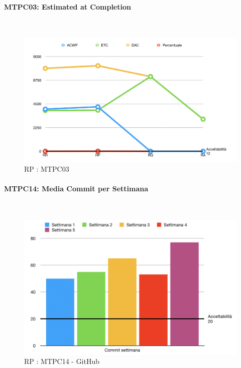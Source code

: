 \pagebreak

\paragraph{MTPC03: Estimated at Completion}\-\\
\begin{figure}[H]
	\begin{center}
		\includegraphics[scale=0.5]{./images/grafici_RP/MTPC03.png} 
	\end{center}
	\caption{RP : MTPC03}
\end{figure}

\paragraph{MTPC14: Media Commit per Settimana}\-\\
\begin{figure}[H]
	\begin{center}
		\includegraphics[scale=0.5]{./images/grafici_RP/commitGithub.png} 
	\end{center}
	\caption{RP : MTPC14 - GitHub}
\end{figure}

